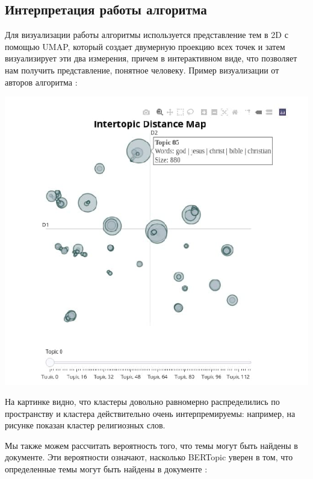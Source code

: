 \subsection{Интерпретация работы алгоритма} 

Для визуализации работы алгоритмы используется представление тем в 2D с помощью UMAP, который создает двумерную проекцию всех точек и затем визуализирует эти два измерения, причем в интерактивном виде, что позволяет нам получить представление, понятное человеку. Пример визуализации от авторов алгоритма \cite{bib_4}:

\begin{center}
\includegraphics[scale=0.9]{pics/bertopic-visual-1.jpg}
\end{center}

На картинке видно, что кластеры довольно равномерно распределились по пространству и кластера действительно очень интерпремируемы: например, на рисунке показан кластер религиозных слов.

Мы также можем рассчитать вероятность того, что темы могут быть найдены в документе. Эти вероятности означают, насколько BERTopic уверен в том, что определенные темы могут быть найдены в документе \cite{bib_4}:

